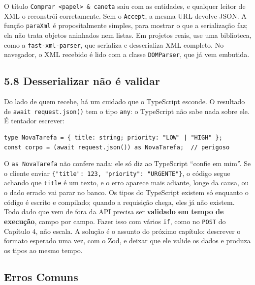 O título \texttt{Comprar <papel> \& caneta} saiu com as entidades, e qualquer leitor de XML o reconstrói corretamente. Sem o \texttt{Accept}, a mesma URL devolve JSON. A função \texttt{paraXml} é propositalmente simples, para mostrar o que a serialização faz; ela não trata objetos aninhados nem listas. Em projetos reais, use uma biblioteca, como a \texttt{fast-xml-parser}, que serializa e desserializa XML completo. No navegador, o XML recebido é lido com a classe \texttt{DOMParser}, que já vem embutida.

\subsection{5.8 Desserializar não é validar}

Do lado de quem recebe, há um cuidado que o TypeScript esconde. O resultado de \texttt{await request.json()} tem o tipo \texttt{any}: o TypeScript não sabe nada sobre ele. É tentador escrever:

\begin{codigo}
\begin{Verbatim}[breaklines=true, breaksymbolleft={}, fontsize=\footnotesize]
type NovaTarefa = { title: string; priority: "LOW" | "HIGH" };
const corpo = (await request.json()) as NovaTarefa;  // perigoso
\end{Verbatim}
\end{codigo}

O \texttt{as NovaTarefa} não confere nada: ele só diz ao TypeScript ``confie em mim''. Se o cliente enviar \texttt{\{"title": 123, "priority": "URGENTE"\}}, o código segue achando que \texttt{title} é um texto, e o erro aparece mais adiante, longe da causa, ou o dado errado vai parar no banco. Os tipos do TypeScript existem só enquanto o código é escrito e compilado; quando a requisição chega, eles já não existem. Todo dado que vem de fora da API precisa ser \textbf{validado em tempo de execução}, campo por campo. Fazer isso com vários \texttt{if}, como no \texttt{POST} do Capítulo 4, não escala. A solução é o assunto do próximo capítulo: descrever o formato esperado uma vez, com o Zod, e deixar que ele valide os dados e produza os tipos ao mesmo tempo.

\subsection{Erros Comuns}

